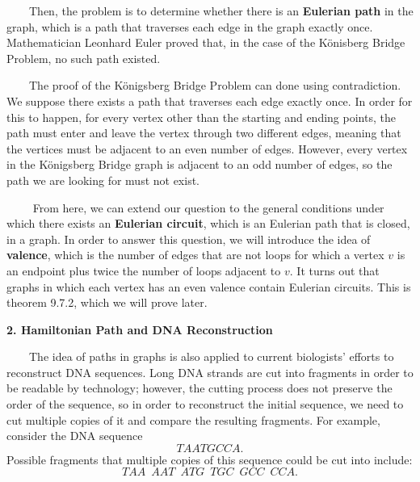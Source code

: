 	$\qquad$Then, the problem is to determine whether there is an \textbf{Eulerian path} in the graph, which is a path that traverses each edge in the graph exactly once. Mathematician Leonhard Euler proved that, in the case of the K\"{o}nisberg Bridge Problem, no such path existed.

	$\qquad$The proof of the K\"{o}nigsberg Bridge Problem can done using contradiction. We suppose there exists a path that traverses each edge exactly once. In order for this to happen, for every vertex other than the starting and ending points, the path must enter and leave the vertex through two different edges, meaning that the vertices must be adjacent to an even number of edges. However, every vertex in the K\"{o}nigsberg Bridge graph is adjacent to an odd number of edges, so the path we are looking for must not exist.

	$\qquad$ From here, we can extend our question to the general conditions under which there exists an \textbf{Eulerian circuit}, which is an Eulerian path that is closed, in a graph. In order to answer this question, we will introduce the idea of \textbf{valence}, which is the number of edges that are not loops for which a vertex $v$ is an endpoint plus twice the number of loops adjacent to $v$. It turns out that graphs in which each vertex has an even valence contain Eulerian circuits. This is theorem 9.7.2, which we will prove later.


	\textbf{2. Hamiltonian Path and DNA Reconstruction}
	
	$\qquad$The idea of paths in graphs is also applied to current biologists' efforts to reconstruct DNA sequences. Long DNA strands are cut into fragments in order to be readable by technology; however, the cutting process does not preserve the order of the sequence, so in order to reconstruct the initial sequence, we need to cut multiple copies of it and compare the resulting fragments. For example, consider the DNA sequence 	
				\[
				TAATGCCA.
				\]
	Possible fragments that multiple copies of this sequence could be cut into include:
				\[
				TAA\enspace AAT\enspace ATG\enspace TGC\enspace GCC\enspace CCA.
				\]
				
